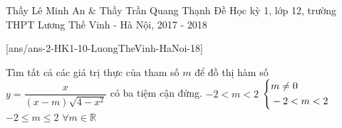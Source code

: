 \begin{name}
{Thầy Lê Minh An \& Thầy Trần Quang Thạnh}
{Đề Học kỳ 1, lớp 12, trường THPT Lương Thế Vinh - Hà Nội, 2017 - 2018}
\end{name}
\setcounter{ex}{0}
\setcounter{bt}{0}
[ans/ans-2-HK1-10-LuongTheVinh-HaNoi-18]
\begin{ex}%
	Tìm tất cả các giá trị thực của tham số $m$ để đồ thị hàm số $y=\dfrac{x}{(x-m)\sqrt{4-x^2}}$ có ba tiệm cận đứng.
	\choice
	{$-2<m<2$}
	{\True $\left\{\begin{aligned}& m\neq 0\\ & -2<m<2\end{aligned}\right.$}
	{$-2\le m\le 2$}
	{$\forall m\in\mathbb{R}$}
\end{ex}

